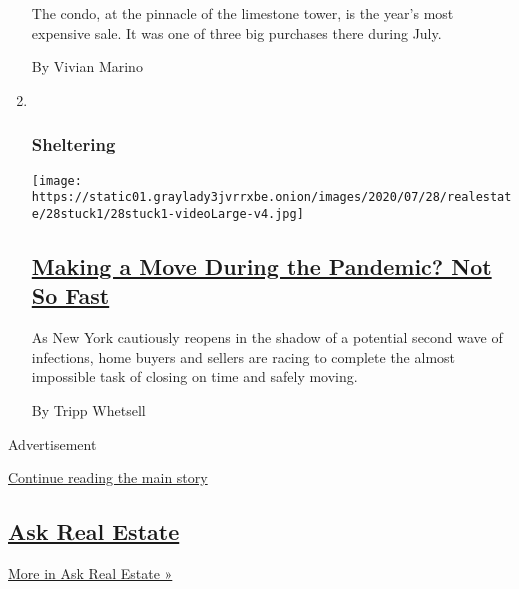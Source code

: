 \begin{enumerate}
  The condo, at the pinnacle of the limestone tower, is the year's most
  expensive sale. It was one of three big purchases there during July.

  By Vivian Marino
\item ~
  \hypertarget{sheltering}{%
  \subsubsection{Sheltering}\label{sheltering}}

  \texttt{[image: https://static01.graylady3jvrrxbe.onion/images/2020/07/28/realestate/28stuck1/28stuck1-videoLarge-v4.jpg]}

  \hypertarget{making-a-move-during-the-pandemic-not-so-fast}{%
  \subsection{\texorpdfstring{\href{/2020/07/28/realestate/buying-selling-moving-during-coronavirus.html}{Making
  a Move During the Pandemic? Not So
  Fast}}{Making a Move During the Pandemic? Not So Fast}}\label{making-a-move-during-the-pandemic-not-so-fast}}

  As New York cautiously reopens in the shadow of a potential second
  wave of infections, home buyers and sellers are racing to complete the
  almost impossible task of closing on time and safely moving.

  By Tripp Whetsell
\end{enumerate}

Advertisement

\protect\hyperlink{after-mid1}{Continue reading the main story}

\hypertarget{ask-real-estate}{%
\subsection{\texorpdfstring{\href{/column/ask-real-estate}{Ask Real
Estate}}{Ask Real Estate}}\label{ask-real-estate}}

\href{/column/ask-real-estate}{More in Ask Real Estate »}

